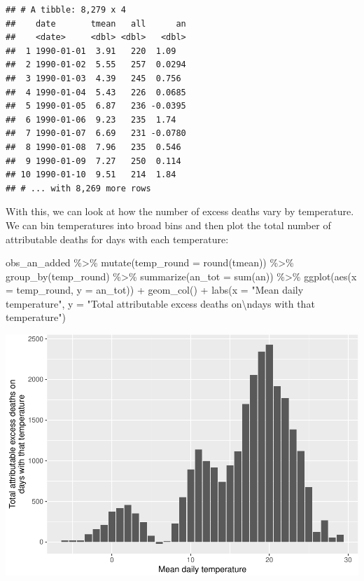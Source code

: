 \documentclass[
]{book}
\newenvironment{Shaded}{\begin{snugshade}}{\end{snugshade}}
\newcommand{\AttributeTok}[1]{\textcolor[rgb]{0.77,0.63,0.00}{#1}}
\newcommand{\FunctionTok}[1]{\textcolor[rgb]{0.00,0.00,0.00}{#1}}
\newcommand{\NormalTok}[1]{#1}
\newcommand{\SpecialCharTok}[1]{\textcolor[rgb]{0.00,0.00,0.00}{#1}}
\newcommand{\StringTok}[1]{\textcolor[rgb]{0.31,0.60,0.02}{#1}}
\begin{document}
\begin{verbatim}
## # A tibble: 8,279 x 4
##    date       tmean   all      an
##    <date>     <dbl> <dbl>   <dbl>
##  1 1990-01-01  3.91   220  1.09  
##  2 1990-01-02  5.55   257  0.0294
##  3 1990-01-03  4.39   245  0.756 
##  4 1990-01-04  5.43   226  0.0685
##  5 1990-01-05  6.87   236 -0.0395
##  6 1990-01-06  9.23   235  1.74  
##  7 1990-01-07  6.69   231 -0.0780
##  8 1990-01-08  7.96   235  0.546 
##  9 1990-01-09  7.27   250  0.114 
## 10 1990-01-10  9.51   214  1.84  
## # ... with 8,269 more rows
\end{verbatim}

With this, we can look at how the number of excess deaths vary by temperature. We can bin temperatures into broad bins and then plot the total number of attributable deaths for days with each temperature:

\begin{Shaded}
\begin{Highlighting}[]
\NormalTok{obs\_an\_added }\SpecialCharTok{\%\textgreater{}\%} 
  \FunctionTok{mutate}\NormalTok{(}\AttributeTok{temp\_round =} \FunctionTok{round}\NormalTok{(tmean)) }\SpecialCharTok{\%\textgreater{}\%} 
  \FunctionTok{group\_by}\NormalTok{(temp\_round) }\SpecialCharTok{\%\textgreater{}\%} 
  \FunctionTok{summarize}\NormalTok{(}\AttributeTok{an\_tot =} \FunctionTok{sum}\NormalTok{(an)) }\SpecialCharTok{\%\textgreater{}\%} 
  \FunctionTok{ggplot}\NormalTok{(}\FunctionTok{aes}\NormalTok{(}\AttributeTok{x =}\NormalTok{ temp\_round, }\AttributeTok{y =}\NormalTok{ an\_tot)) }\SpecialCharTok{+} 
  \FunctionTok{geom\_col}\NormalTok{() }\SpecialCharTok{+} 
  \FunctionTok{labs}\NormalTok{(}\AttributeTok{x =} \StringTok{"Mean daily temperature"}\NormalTok{, }
       \AttributeTok{y =} \StringTok{"Total attributable excess deaths on}\SpecialCharTok{\textbackslash{}n}\StringTok{days with that temperature"}\NormalTok{)}
\end{Highlighting}
\end{Shaded}

\includegraphics{adv_epi_analysis_files/figure-latex/unnamed-chunk-159-1.pdf}
\end{document}
